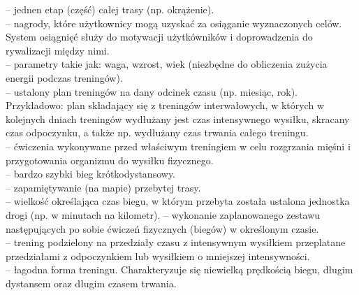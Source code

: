 \begin{multicols}{2}
\begin{description}
	-- jednen etap (część) całej trasy (np. okrążenie).\\
	-- nagrody, które użytkownicy mogą uzyskać za osiąganie wyznaczonych celów. System osiągnięć służy do motywacji użytkówników i doprowadzenia do rywalizacji między nimi.\\
	-- parametry takie jak: waga, wzrost, wiek (niezbędne do obliczenia zużycia energii podczas treningów).\\
	-- ustalony plan treningów na dany odcinek czasu (np. miesiąc, rok). Przykładowo: plan składający się z treningów interwałowych, w których w kolejnych dniach treningów wydłużany jest czas intensywnego wysiłku, skracany czas odpoczynku, a także np. wydłużany czas trwania całego treningu.\\
	-- ćwiczenia wykonywane przed właściwym treningiem w celu rozgrzania mięśni i przygotowania organizmu do wysiłku fizycznego.\\
	-- bardzo szybki bieg krótkodystansowy.\\
	-- zapamiętywanie (na mapie) przebytej trasy.\\
	-- wielkość określająca czas biegu, w którym przebyta została ustalona jednostka drogi (np. w minutach na kilometr).
	-- wykonanie zaplanowanego zestawu następujących po sobie ćwiczeń fizycznych (biegów) w określonym czasie. \\
	-- trening podzielony na przedziały czasu z intensywnym wysiłkiem przeplatane przedziałami z odpoczynkiem lub wysiłkiem o mniejszej intensywności.\\
	-- łagodna forma treningu. Charakteryzuje się niewielką prędkością biegu, długim dystansem oraz długim czasem trwania.\\
  \end{description}
\end{multicols}

